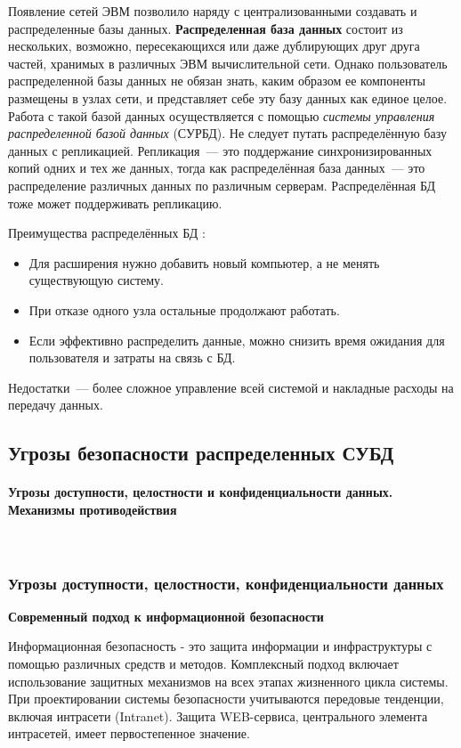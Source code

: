 Появление сетей ЭВМ позволило наряду с централизованными создавать и распределенные базы данных.
\textbf{Распределенная база данных} состоит из нескольких, возможно, пересекающихся или даже дублирующих друг друга
частей, хранимых в различных ЭВМ вычислительной сети. Однако пользователь распределенной базы данных не обязан
знать, каким образом ее компоненты размещены в узлах сети, и представляет себе эту базу данных как единое
целое. Работа с такой базой данных осуществляется с помощью \textit{системы управления распределенной базой данных} (СУРБД).
Не следует путать распределённую базу данных с репликацией. Репликация~--- это поддержание синхронизированных
копий одних и тех же данных, тогда как распределённая база данных~--- это распределение различных данных по различным серверам.
Распределённая БД тоже может поддерживать репликацию.

Преимущества распределённых БД \autocite{DDBMSIndusEdition}:
\begin{itemize}
    \item Для расширения нужно добавить новый компьютер, а не менять существующую систему.
    \item При отказе одного узла остальные продолжают работать.
    \item Если эффективно распределить данные, можно снизить время ожидания для пользователя и затраты на связь с БД.
\end{itemize}

Недостатки~--- более сложное управление всей системой и накладные расходы на передачу данных.


\subsection{Угрозы безопасности распределенных СУБД}
\paragraph{Угрозы доступности, целостности и конфиденциальности данных. Механизмы противодействия} ~\\

\subsubsection{Угрозы доступности, целостности, конфиденциальности данных}
\textbf{Современный подход к информационной безопасности}

Информационная безопасность - это защита информации и инфраструктуры с помощью различных средств и методов. Комплексный подход включает использование защитных механизмов на всех этапах жизненного цикла системы. При проектировании системы безопасности учитываются передовые тенденции, включая интрасети (Intranet). Защита WEB-сервиса, центрального элемента интрасетей, имеет первостепенное значение.

